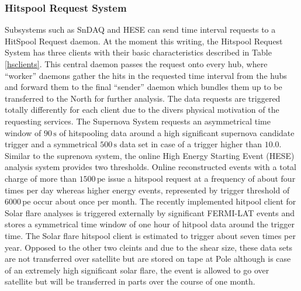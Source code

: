 \subsubsection{\label{sect:hitspool}Hitspool Request System}

Subsystems such as SnDAQ and HESE can send time interval requests to a HitSpool
Request daemon. At the moment this writing, the Hitspool Request System has three clients with their basic characteristics described in Table \ref{hsclients}. This central daemon passes the request onto every hub, where ``worker'' daemons gather the hits in the requested time interval from the hubs and forward them to the final ``sender'' daemon which bundles them up to be transferred to the North for further analysis. The data requests are triggered totally differently for each client due to the divers physical motivation of the requesting services. The Supernova System requests an asymmetrical time window of $90 \,\mathrm{s}$ of hitspooling data around a high significant supernova candidate trigger and a symmetrical $500\,\mathrm{s}$ data set in case of a trigger higher than $10.0$.
Similar to the suprenova system, the online High Energy Starting Event (HESE) analysis system provides two thresholds. Online reconstructed events with a total charge of more than $1500 \,\mathrm{pe}$ issue a hitspool request at a frequency of about four times per day whereas higher energy events, represented by  trigger threshold of $6000 \,\mathrm{pe}$ occur about once per month.
The recently implemented hitpool client for Solar flare analyses is triggered externally by significant FERMI-LAT events and stores a symmetrical time window of one hour of hitpool data around the trigger time. The Solar flare hitspool client is estimated to trigger about seven times per year. Opposed to the other two cleints and due to the shear size, these data sets are not transferred over satellite but are stored on tape at Pole although is case of an extremely high significant solar flare, the event is allowed to go over satellite but will be transferred in parts over the course of one month.


